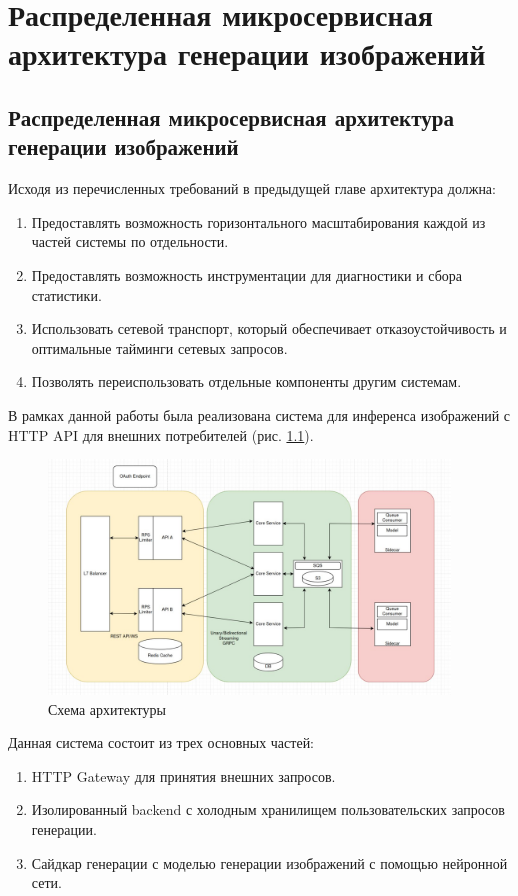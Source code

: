 \chapter{Распределенная микросервисная архитектура генерации изображений}
\section{Распределенная микросервисная архитектура генерации изображений}
Исходя из перечисленных требований в предыдущей главе архитектура должна:
\begin{enumerate}
    \item Предоставлять возможность горизонтального масштабирования каждой из частей системы по отдельности.
    \item Предоставлять возможность инструментации для диагностики и сбора статистики.
    \item Использовать сетевой транспорт, который обеспечивает отказоустойчивость и оптимальные тайминги сетевых запросов.
    \item Позволять переиспользовать отдельные компоненты другим системам.
\end{enumerate}

В рамках данной работы была реализована система для инференса изображений с HTTP API для внешних потребителей (рис. \ref{fig:design}).

\begin{footnotesize}
\begin{figure}[H]
  \centering
  \includegraphics[width=0.95\textwidth]{img/design.png}
  \caption{Схема архитектуры}
    \label{fig:design}
\end{figure}
\end{footnotesize}

Данная система состоит из трех основных частей:
\begin{enumerate}
    \item HTTP Gateway для принятия внешних запросов.
    \item Изолированный backend с холодным хранилищем пользовательских запросов генерации.
    \item Сайдкар генерации с моделью генерации изображений с помощью нейронной сети.
\end{enumerate}

